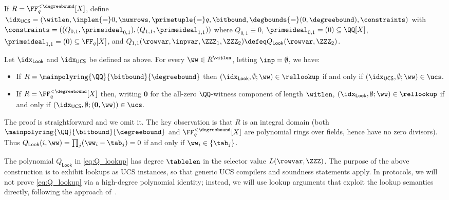 If $R=\FF_q^{<\degreebound}[X]$, define
$\idx_{\mathsf{UCS}}=(\witlen,\inplen{=}0,\numrows,\primetuple{=}q,\bitbound,\degbounds{=}(0,\degreebound),\constraints)$
with $\constraints=((Q_{0,1},\primeideal_{0,1}),(Q_{1,1},\primeideal_{1,1}))$ where
$Q_{0,1}\equiv 0$, $\primeideal_{0,1}=(0)\subseteq\QQ[X]$, $\primeideal_{1,1}=(0)\subseteq\FF_q[X]$, and
$Q_{1,1}(\rowvar,\inpvar,\ZZZ_1,\ZZZ_2)\defeq Q_{\mathsf{Look}}(\rowvar,\ZZZ_2)$.
\begin{lemma}
\label{lem:lookup_as_ucs}
Let $\idx_{\mathsf{Look}}$ and $\idx_{\mathsf{UCS}}$ be defined as above.
For every $\ww\in R^{\witlen}$, letting $\inp=\emptyset$, we have:
\begin{itemize}[leftmargin=*]
\item If $R=\mainpolyring{\QQ}{\bitbound}{\degreebound}$ then
$(\idx_{\mathsf{Look}},\emptyset;\ww)\in\rellookup$ if and only if
$(\idx_{\mathsf{UCS}},\emptyset;\ww)\in\ucs.$
\item If $R=\FF_q^{<\degreebound}[X]$ then, writing $\mathbf{0}$ for the all-zero $\QQ$-witness
component of length $\witlen$,
$(\idx_{\mathsf{Look}},\emptyset;\ww)\in\rellookup$ if and only if
$(\idx_{\mathsf{UCS}},\emptyset;(\mathbf{0},\ww))\in\ucs.$
\end{itemize}
\end{lemma}
The proof is straightforward and we omit it. The key observation is that $R$ is an integral domain (both $\mainpolyring{\QQ}{\bitbound}{\degreebound}$ and $\FF_q^{<\degreebound}[X]$ are polynomial rings over fields, hence have no zero divisors).
Thus $Q_{\mathsf{Look}}(i,\ww)=\prod_{j}(\ww_i - \tab_j)=0$ if and only if $\ww_i\in\{\tab_j\}$. 

\begin{remark}
The polynomial $Q_{\mathsf{Look}}$ in \eqref{eq:Q_lookup} has degree $\tablelen$ in the selector
value $L(\rowvar,\ZZZ)$.
The purpose of the above construction is to exhibit lookups as UCS instances, so that generic UCS
compilers and soundness statements apply.
In protocols, we will not prove \eqref{eq:Q_lookup} via a high-degree polynomial identity;
instead, we will use lookup arguments that exploit the lookup semantics directly, following the
approach of~\cite{Zinc}. 
\end{remark}

